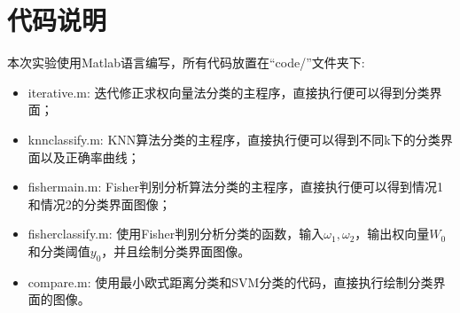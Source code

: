 \documentclass[cn]{elegantbook}
\begin{document}
\chapter{代码说明}
\noindent 本次实验使用Matlab语言编写，所有代码放置在“code/”文件夹下:
\begin{itemize}
	\item iterative.m: 迭代修正求权向量法分类的主程序，直接执行便可以得到分类界面；
	\item knnclassify.m: KNN算法分类的主程序，直接执行便可以得到不同k下的分类界面以及正确率曲线；
	\item fishermain.m: Fisher判别分析算法分类的主程序，直接执行便可以得到情况1和情况2的分类界面图像；
	\item fisherclassify.m: 使用Fisher判别分析分类的函数，输入$\omega_1, \omega_2$，输出权向量$W_0$和分类阈值$y_0$，并且绘制分类界面图像。
	\item compare.m: 使用最小欧式距离分类和SVM分类的代码，直接执行绘制分类界面的图像。
\end{itemize}
\end{document}
